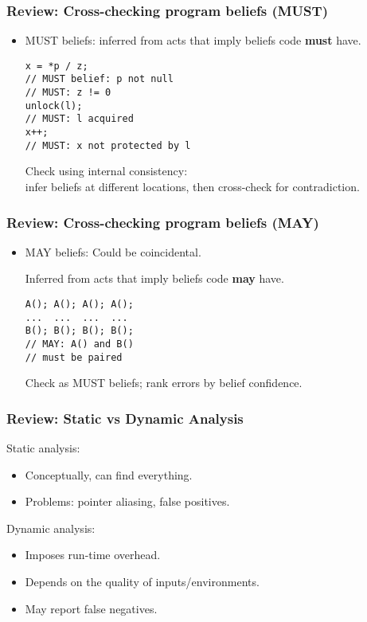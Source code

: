 \documentclass{beamer}
\newenvironment{changemargin}[1]{%
  \begin{list}{}{%
    \setlength{\topsep}{0pt}%
    \setlength{\leftmargin}{#1}%
    \setlength{\rightmargin}{1em}
    \setlength{\listparindent}{\parindent}%
    \setlength{\itemindent}{\parindent}%
    \setlength{\parsep}{\parskip}%
  }%
  \item[]}{\end{list}}
\begin{document}
\begin{frame}[fragile]
  \frametitle{Review: Cross-checking program beliefs (MUST)}
  \begin{changemargin}{1cm}
\begin{itemize}
\item MUST beliefs:
inferred from acts that imply beliefs code {\bf must} have.
\begin{lstlisting}
x = *p / z; 
// MUST belief: p not null
// MUST: z != 0
unlock(l);
// MUST: l acquired
x++;
// MUST: x not protected by l
\end{lstlisting}

 Check using internal consistency: \\
infer beliefs at different
locations, then cross-check for contradiction.
\end{itemize}
  \end{changemargin}
\end{frame}

\begin{frame}[fragile]
  \frametitle{Review: Cross-checking program beliefs (MAY)}
  \begin{changemargin}{1cm}
\begin{itemize}
\item MAY beliefs: 
Could be coincidental.

Inferred from acts that imply beliefs code {\bf may} have.
\begin{lstlisting}
A(); A(); A(); A();
...  ...  ...  ... 
B(); B(); B(); B();
// MAY: A() and B()
// must be paired
\end{lstlisting}

Check as MUST beliefs; rank errors by belief confidence.
\end{itemize}
  \end{changemargin}
\end{frame}

\begin{frame}
  \frametitle{Review: Static vs Dynamic Analysis}
  \begin{changemargin}{2cm}

Static analysis:
\begin{itemize}
\item Conceptually, can find everything.
\item Problems: pointer aliasing, false positives.
\end{itemize}

Dynamic analysis:
\begin{itemize}
\item Imposes run-time overhead.
\item Depends on the quality of inputs/environments.
\item May report false negatives.
\end{itemize}
  \end{changemargin}
\end{frame}
\end{document}
